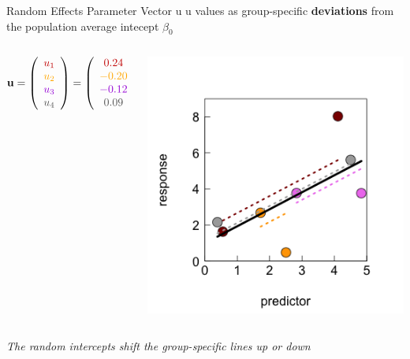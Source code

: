 \documentclass{beamer}
\begin{document}
\begin{frame}{Random Effects Parameter Vector u}
\large u values as group-specific \textbf{deviations} from the population average intecept $\beta_0$
\begin{columns}
        \begin{column}{0.5\textwidth}
\[
\mathbf{u} = \left( 
\begin{array}{c} 
\color{darkred}{u_1} \\ 
\color{orange}{u_2} \\ 
\color{violet}{u_3} \\ 
\color{darkgray}{u_4} 
\end{array}\right) = \left( 
\begin{array}{c} 
\color{darkred}{0.24} \\ 
\color{orange}{-0.20} \\ 
\color{violet}{-0.12} \\ 
\color{darkgray}{0.09} 
\end{array}\right)
\]
        \end{column}
        \begin{column}{0.5\textwidth}
            \includegraphics[width=\textwidth]{lectures/day_5_theory_of_mems/figures/unnamed-chunk-6-1.png}
        \end{column}
    \end{columns}
    \vspace{0.2cm}
\large\textit{The random intercepts shift the group-specific lines up or down}
\end{frame}
\end{document}
